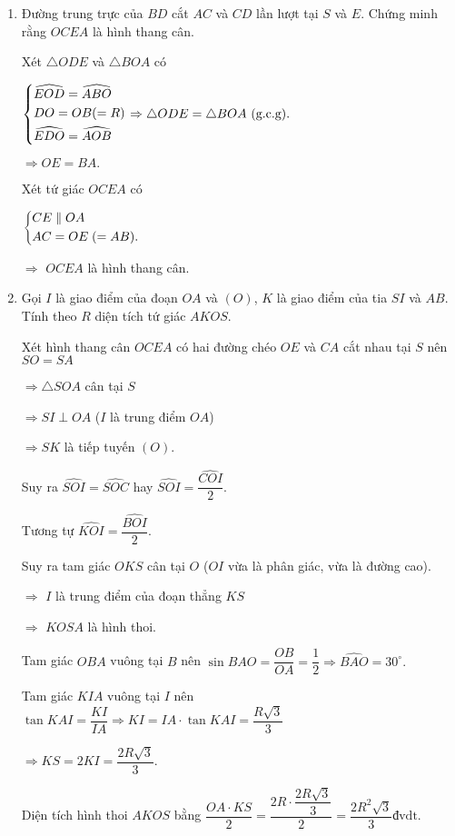 \begin{bt}
{\begin{enumerate}
	$AB$, $AC$ là tiếp của đường tròn nên $AO \perp BC.$
	
	$\triangle BDC$ nội tiếp đường tròn đường kính $BD$ nên $\widehat{DCB}=90^\circ$ hay $DC \perp BC.$
	
	Vậy $OA \parallel DC$ (cùng vuông góc với $BC$).
	\item Đường trung trực của $BD$ cắt $AC$ và $CD$ lần lượt tại $S$ và $E$. Chứng minh rằng $OCEA$ là hình thang cân.
	
	Xét $\triangle ODE$ và $\triangle BOA$ có
	
	$\left\{\begin{aligned}&\widehat{EOD}=\widehat{ABO}\\
	& DO= OB(=R)\\ & \widehat{EDO}=\widehat{AOB}\end{aligned}\right.\Rightarrow \triangle ODE =\triangle BOA \text{ (g.c.g)}.$

	$\Rightarrow OE = BA.$
	
	Xét tứ giác $OCEA$ có 
	
	$\left\{\begin{aligned}& CE \parallel OA \\ & AC = OE \; (=AB).\end{aligned}\right.$
	
	$\Rightarrow$ $OCEA$ là hình thang cân.
	\item Gọi $I$ là giao điểm của đoạn $OA$ và $(O)$, $K$ là giao điểm của tia $SI$ và $AB$. Tính theo $R$ diện tích tứ giác $AKOS$. 
	
	Xét hình thang cân $OCEA$ có hai đường chéo $OE$ và $CA$ cắt nhau tại $S$ nên $SO=SA$
	
	$\Rightarrow \triangle SOA$ cân tại $S$
	
	$\Rightarrow SI \perp OA$ ($I$ là trung điểm $OA$)
	
	$\Rightarrow SK$ là tiếp tuyến $(O).$
	
	Suy ra $\widehat{SOI}=\widehat{SOC}$ hay $\widehat{SOI}=\dfrac{\widehat{COI}}{2}.$
	
	Tương tự $\widehat{KOI}=\dfrac{\widehat{BOI}}{2}.$
	
	Suy ra tam giác $OKS$ cân tại $O$ ($OI$ vừa là phân giác, vừa là đường cao).
	
	$\Rightarrow$ $I$ là trung điểm của đoạn thẳng $KS$
	
	$\Rightarrow$ $KOSA$ là hình thoi. 
		
	Tam giác $OBA$ vuông tại $B$ nên $\sin BAO = \dfrac{OB}{OA}=\dfrac{1}{2} \Rightarrow \widehat{BAO}=30^\circ.$
	
	Tam giác $KIA$ vuông tại $I$ nên $\tan KAI = \dfrac{KI}{IA} \Rightarrow KI = IA\cdot \tan KAI= \dfrac{R\sqrt{3}}{3}$
	
	$\Rightarrow KS=2KI=\dfrac{2R\sqrt{3}}{3}.$
	
	Diện tích hình thoi $AKOS$ bằng $\dfrac{OA \cdot KS}{2}=\dfrac{2R \cdot \dfrac{2R\sqrt{3}}{3}}{2}=\dfrac{2R^2\sqrt{3}}{3}\text{đvdt}.$ 
\end{enumerate}	
	}
\end{bt}

